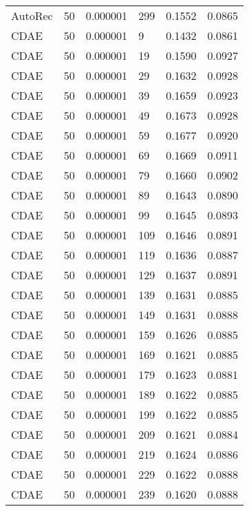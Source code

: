 \begin{tabular}{llrlrr}
 AutoRec &   50 &  0.000001 &   299 &  0.1552 &       0.0865 \\
    CDAE &   50 &  0.000001 &     9 &  0.1432 &       0.0861 \\
    CDAE &   50 &  0.000001 &    19 &  0.1590 &       0.0927 \\
    CDAE &   50 &  0.000001 &    29 &  0.1632 &       0.0928 \\
    CDAE &   50 &  0.000001 &    39 &  0.1659 &       0.0923 \\
    CDAE &   50 &  0.000001 &    49 &  0.1673 &       0.0928 \\
    CDAE &   50 &  0.000001 &    59 &  0.1677 &       0.0920 \\
    CDAE &   50 &  0.000001 &    69 &  0.1669 &       0.0911 \\
    CDAE &   50 &  0.000001 &    79 &  0.1660 &       0.0902 \\
    CDAE &   50 &  0.000001 &    89 &  0.1643 &       0.0890 \\
    CDAE &   50 &  0.000001 &    99 &  0.1645 &       0.0893 \\
    CDAE &   50 &  0.000001 &   109 &  0.1646 &       0.0891 \\
    CDAE &   50 &  0.000001 &   119 &  0.1636 &       0.0887 \\
    CDAE &   50 &  0.000001 &   129 &  0.1637 &       0.0891 \\
    CDAE &   50 &  0.000001 &   139 &  0.1631 &       0.0885 \\
    CDAE &   50 &  0.000001 &   149 &  0.1631 &       0.0888 \\
    CDAE &   50 &  0.000001 &   159 &  0.1626 &       0.0885 \\
    CDAE &   50 &  0.000001 &   169 &  0.1621 &       0.0885 \\
    CDAE &   50 &  0.000001 &   179 &  0.1623 &       0.0881 \\
    CDAE &   50 &  0.000001 &   189 &  0.1622 &       0.0885 \\
    CDAE &   50 &  0.000001 &   199 &  0.1622 &       0.0885 \\
    CDAE &   50 &  0.000001 &   209 &  0.1621 &       0.0884 \\
    CDAE &   50 &  0.000001 &   219 &  0.1624 &       0.0886 \\
    CDAE &   50 &  0.000001 &   229 &  0.1622 &       0.0888 \\
    CDAE &   50 &  0.000001 &   239 &  0.1620 &       0.0888 \\

\end{tabular}
